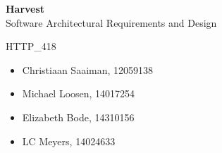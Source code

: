\documentclass[11pt,fleqn]{book} %
\begin{document}

\begingroup
\thispagestyle{empty}
\centering
\vspace*{5cm}
\par\normalfont\fontsize{35}{35}\sffamily\selectfont
\textbf{Harvest}\\
{\LARGE Software Architectural Requirements and Design}\par %
\vspace*{0.5cm}
{\Huge HTTP\_418}\par
\centering
\vspace*{0.5cm}
\begin{itemize}[label={}, noitemsep]	
		\Large
		\item \begin{center} Christiaan Saaiman, 12059138 \end{center}
		\item \begin{center} Michael Loosen, 14017254 \end{center}
		\item \begin{center} Elizabeth Bode, 14310156 \end{center}
		\item \begin{center} LC Meyers, 14024633 \end{center}	
\end{itemize}
\endgroup



\pagestyle{empty} %

\tableofcontents %


\pagestyle{fancy} %

\end{document}
